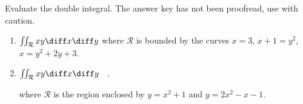 Evaluate the double integral. The answer key has not been proofread, use with caution.

\begin{enumerate}[ref={\fcProblemRef}]
\item \label{problemintegralxydxdyoverx=3,x+1=y^2,x=y^2+2y+3} $\iint_{\mathcal R} xy \diff x\diff y$ where $\mathcal R$ is bounded by the curves $x=3 $, $x+1=y^2$, $x= y^2+2y+3$.

\item \label{problemintegralxydxdyovery=x^2+1,y=2x^2-x-1} 
$\iint_{\mathcal R} xy\diff x\diff y\quad .$

where $\mathcal R$ is the region enclosed by $y=x^2+1$ and $y=2x^2-x-1$.  

\end{enumerate}


